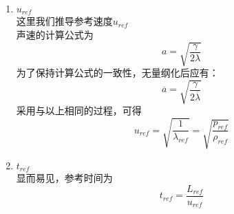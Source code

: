 \documentclass[a4paper,11pt]{article}
\begin{document}
\begin {enumerate}
    \item {$u_{ref}$} \\
        这里我们推导参考速度$u_{ref}$ \\
        声速的计算公式为
        \begin{equation}
            a=\sqrt{\frac{\gamma}{2\lambda}}
        \end{equation}
        为了保持计算公式的一致性，无量纲化后应有：
        \begin{equation}
            \overline{a}=\sqrt{\frac{\gamma}{2\overline{\lambda}}}
        \end{equation}
        采用与以上相同的过程，可得
        \begin{equation}
            u_{ref} = \sqrt{\frac{1}{\lambda_{ref}}}=\sqrt{\frac{p_{ref}}{\rho_{ref}}}
        \end{equation}
    \item {$t_{ref}$}\\
        显而易见，参考时间为
        \begin{equation}
            t_{ref} = \frac{L_{ref}}{u_{ref}}
        \end{equation}
\end{enumerate}
\end{document}

